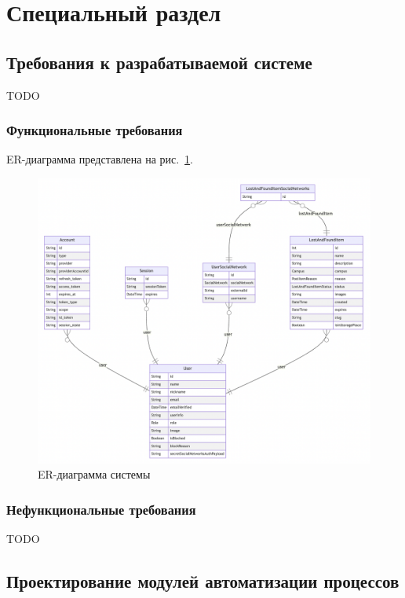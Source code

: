 \section{Специальный раздел}
\label{sec:special}

\subsection{Требования к разрабатываемой системе}

TODO

\subsubsection{Функциональные требования}

ER-диаграмма представлена на рис.~\ref{fig:erd}.

\begin{figure}[htb]
	\centering
	\includegraphics[width=.95\textwidth]{images/erd}
	\parskip=6pt
	\caption{ER-диаграмма системы}
	\label{fig:erd}
\end{figure}

\subsubsection{Нефункциональные требования}

TODO

\subsection{Проектирование модулей автоматизации процессов}

